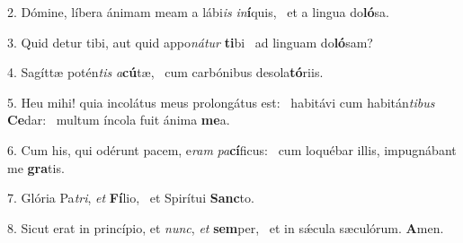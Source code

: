 2. Dómine, líbera ánimam meam a lábi\textit{is} \textit{in}\textbf{í}quis, \ast\  et a lingua do\textbf{ló}sa.\

3. Quid detur tibi, aut quid appo\textit{ná}\textit{tur} \textbf{ti}bi \ast\  ad linguam do\textbf{ló}sam?\

4. Sagíttæ potén\textit{tis} \textit{a}\textbf{cú}tæ, \ast\  cum carbónibus desola\textbf{tó}riis.\

5. Heu mihi! quia incolátus meus prolongátus est: \dag\  habitávi cum habitán\textit{ti}\textit{bus} \textbf{Ce}dar: \ast\  multum íncola fuit ánima \textbf{me}a.\

6. Cum his, qui odérunt pacem, e\textit{ram} \textit{pa}\textbf{cí}ficus: \ast\  cum loquébar illis, impugnábant me \textbf{gra}tis.\

7. Glória Pa\textit{tri}, \textit{et} \textbf{Fí}lio, \ast\  et Spirítui \textbf{Sanc}to.\

8. Sicut erat in princípio, et \textit{nunc}, \textit{et} \textbf{sem}per, \ast\  et in sǽcula sæculórum. \textbf{A}men.\

